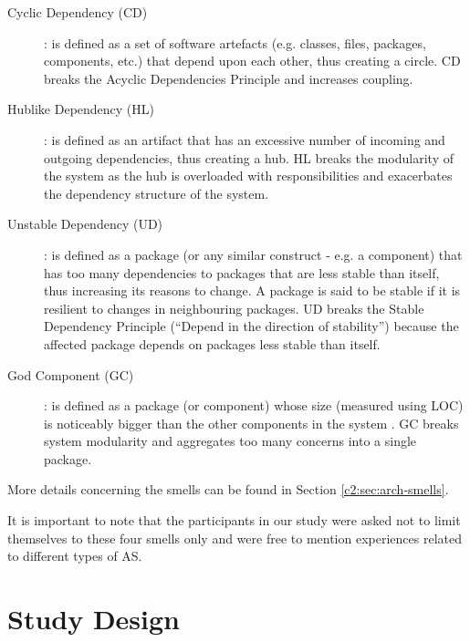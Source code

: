 \begin{description}
	\item[Cyclic Dependency (CD)]: is defined as a set of software artefacts (e.g. classes, files, packages, components, etc.) that depend upon each other, thus creating a circle. CD breaks the Acyclic Dependencies Principle \cite{Martin2018} and increases coupling.
	
	\item[Hublike Dependency (HL)]: is defined as an artifact that has an excessive number of incoming and outgoing dependencies, thus creating a hub. HL breaks the modularity of the system as the hub is overloaded with responsibilities and exacerbates the dependency structure of the system.

	\item[Unstable Dependency (UD)]: is defined as a package (or any similar construct - e.g. a component) that has too many dependencies to packages that are less stable than itself, thus increasing its reasons to change. A package is said to be stable if it is resilient to changes in neighbouring packages. UD breaks the Stable Dependency Principle (“Depend in the direction of stability”) \cite{Martin2018} because the affected package depends on packages less stable than itself.
	
	\item[God Component (GC)]: is defined as a package (or component) whose size (measured using LOC) is noticeably bigger than the other components in the system  \cite{Lippert2006}. GC breaks system modularity and aggregates too many concerns into a single package.
\end{description}
More details concerning the smells can be found in Section \ref{c2:sec:arch-smells}.

It is important to note that the participants in our study were asked not to limit themselves to these four smells only and were free to mention experiences related to different types of AS.

\section{Study Design}\label{c3:sec:case-study}

